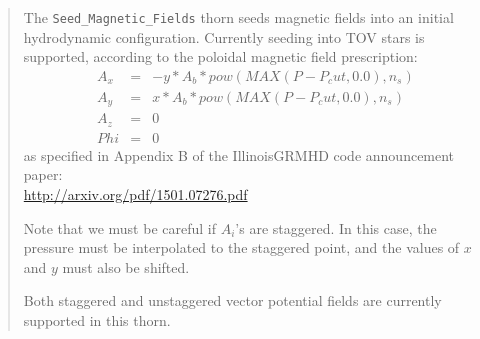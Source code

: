 \documentclass{article}
\begin{document}
%
% 
%
%
%
%






\begin{abstract}
The {\tt Seed\_Magnetic\_Fields} thorn seeds magnetic fields into an
initial hydrodynamic configuration. Currently seeding into TOV stars
is supported, according to the poloidal magnetic field prescription:
\begin{eqnarray}
A_x &=& -y*A_b*pow(MAX(P-P_cut,0.0),n_s) \\
A_y &=&  x*A_b*pow(MAX(P-P_cut,0.0),n_s) \\
A_z &=& 0 \\
Phi &=& 0
\end{eqnarray}
as specified in Appendix B of the IllinoisGRMHD code
announcement paper:\\
\url{http://arxiv.org/pdf/1501.07276.pdf}

Note that we must be careful if $A_i$'s are staggered. In this
case, the pressure must be interpolated to the staggered
point, and the values of $x$ and $y$ must also be shifted.

Both staggered and unstaggered vector potential fields are currently
supported in this thorn.

\end{abstract}
\end{document}

